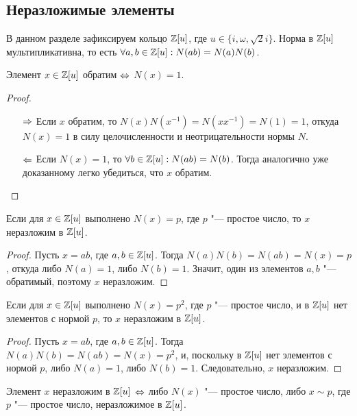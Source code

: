 \subsection{Неразложимые элементы}

В данном разделе зафиксируем кольцо $\mathbb{Z}[u]$, где $u \in \{i, \omega, \sqrt{2}i\}$. Норма в $\mathbb{Z}[u]$ мультипликативна, то есть $\forall a, b \in \mathbb{Z}[u]: N(ab) = N(a)N(b)$.

\begin{proposition}
	Элемент $x \in \mathbb{Z}[u]$ обратим $\Leftrightarrow$ $N(x) = 1$.
\end{proposition}

\begin{proof}~
	\begin{itemize}
		\item[$\Rightarrow$] Если $x$ обратим, то $N(x)N(x^{-1}) = N(xx^{-1}) = N(1) = 1$, откуда $N(x) = 1$ в силу целочисленности и неотрицательности нормы $N$.
		\item[$\Leftarrow$] Если $N(x) = 1$, то $\forall b \in \mathbb{Z}[u]: N(ab) = N(b)$. Тогда аналогично уже доказанному легко убедиться, что $x$ обратим.\qedhere
	\end{itemize}
\end{proof}

\begin{proposition}
	Если для $x \in \mathbb{Z}[u]$ выполнено $N(x) = p$, где $p$ "--- простое число, то $x$ неразложим в $\mathbb{Z}[u]$.
\end{proposition}

\begin{proof}
	Пусть $x = ab$, где $a, b \in \mathbb{Z}[u]$. Тогда $N(a)N(b) = N(ab) = N(x) = p$, откуда либо $N(a) = 1$, либо $N(b) = 1$. Значит, один из элементов $a, b$ "--- обратимый, поэтому $x$ неразложим.
\end{proof}

\begin{proposition}
	Если для $x \in \mathbb{Z}[u]$ выполнено $N(x) = p^2$, где $p$ "--- простое число, и в $\mathbb{Z}[u]$ нет элементов с нормой $p$, то $x$ неразложим в $\mathbb{Z}[u]$.
\end{proposition}

\begin{proof}
	Пусть $x = ab$, где $a, b \in \mathbb{Z}[u]$. Тогда $N(a)N(b) = N(ab) = N(x) = p^2$, и, поскольку в $\mathbb{Z}[u]$ нет элементов с нормой $p$, либо $N(a) = 1$, либо $N(b) = 1$. Следовательно, $x$ неразложим.
\end{proof}

\begin{theorem}
	Элемент $x$ неразложим в $\mathbb{Z}[u]$ $\Leftrightarrow$ либо $N(x)$ "--- простое число, либо $x \sim p$, где $p$ "--- простое число, неразложимое в $\mathbb{Z}[u]$.
\end{theorem}

